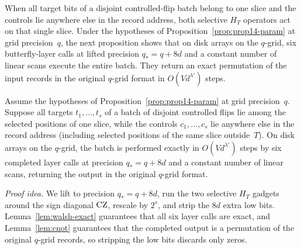 When all target bits of a disjoint controlled-flip batch belong to one slice and the controls lie anywhere else in the
record address, both selective $H_T$ operators act on that single slice. Under the hypotheses of
Proposition~\ref{prop:prop14-param} at grid precision~$q$, the next proposition shows that on disk arrays on the $q$-grid,
six butterfly-layer calls at lifted precision $q_*=q+8d$ and a constant number of linear scans execute the entire batch.
They return an exact permutation of the input records in the original $q$-grid format in $O(Vd^{\lambda'})$ steps.

\begin{proposition}\label{prop:cnot-batch}
Assume the hypotheses of Proposition~\ref{prop:prop14-param} at grid precision~$q$. Suppose all targets $t_1,\dots,t_s$
of a batch of disjoint controlled flips lie among the selected positions of one slice, while the controls $c_1,\dots,c_s$
lie anywhere else in the record address (including selected positions of the same slice outside~$T$). On disk arrays on
the $q$-grid, the batch is performed exactly in $O(Vd^{\lambda'})$ steps by six completed layer calls at precision
$q_*=q+8d$ and a constant number of linear scans, returning the output in the original $q$-grid format.
\end{proposition}

\emph{Proof idea.} We lift to precision $q_*=q+8d$, run the two selective $H_T$ gadgets around the sign diagonal $\mathrm{CZ}$,
rescale by $2^s$, and strip the $8d$ extra low bits. Lemma~\ref{lem:walsh-exact} guarantees that all six layer calls are
exact, and Lemma~\ref{lem:cnot} guarantees that the completed output is a permutation of the original $q$-grid records,
so stripping the low bits discards only zeros.

